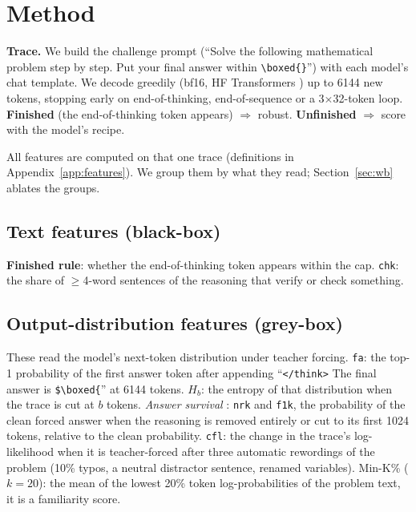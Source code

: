 \documentclass{article}
\begin{document}
\section{Method}
\label{sec:method}
\textbf{Trace.} We build the challenge prompt (``Solve the following mathematical problem step by step. Put your final answer within \texttt{\textbackslash boxed\{\}}'') with each model's chat template. We decode greedily (bf16, HF Transformers \citep{wolf2020transformers}) up to 6144 new tokens, stopping early on end-of-thinking, end-of-sequence or a 3$\times$32-token loop.
\textbf{Finished} (the end-of-thinking token appears) $\Rightarrow$ robust. \textbf{Unfinished} $\Rightarrow$ score with the model's recipe.

All features are computed on that one trace (definitions in Appendix~\ref{app:features}). We group them by what they read; Section~\ref{sec:wb} ablates the groups.

\subsection{Text features (black-box)}
\textbf{Finished rule}: whether the end-of-thinking token appears within the cap. \texttt{chk}: the share of $\ge$4-word sentences of the reasoning that verify or check something.

\subsection{Output-distribution features (grey-box)}
These read the model's next-token distribution under teacher forcing.
\texttt{fa}: the top-1 probability of the first answer token after appending ``\texttt{</think>} The final answer is \texttt{\$\textbackslash boxed\{}'' at 6144 tokens.
$H_{b}$: the entropy of that distribution when the trace is cut at $b$ tokens.
\emph{Answer survival} \citep[cf.\ early answering,][]{lanham2023faithfulness}: \texttt{nrk} and \texttt{f1k}, the probability of the clean forced answer when the reasoning is removed entirely or cut to its first 1024 tokens, relative to the clean probability.
\texttt{cfl}: the change in the trace's log-likelihood when it is teacher-forced after three automatic rewordings of the problem (10\% typos, a neutral distractor sentence, renamed variables).
Min-K\% \citep{shi2024mink} ($k=20$): the mean of the lowest 20\% token log-probabilities of the problem text, it is a familiarity score.
\end{document}
